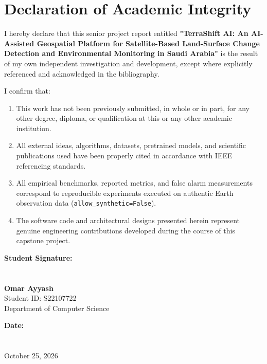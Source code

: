 \chapter*{Declaration of Academic Integrity}
\thispagestyle{empty}

I hereby declare that this senior project report entitled \textbf{"TerraShift AI: An AI-Assisted Geospatial Platform for Satellite-Based Land-Surface Change Detection and Environmental Monitoring in Saudi Arabia"} is the result of my own independent investigation and development, except where explicitly referenced and acknowledged in the bibliography.

I confirm that:
\begin{enumerate}
    \item This work has not been previously submitted, in whole or in part, for any other degree, diploma, or qualification at this or any other academic institution.
    \item All external ideas, algorithms, datasets, pretrained models, and scientific publications used have been properly cited in accordance with IEEE referencing standards.
    \item All empirical benchmarks, reported metrics, and false alarm measurements correspond to reproducible experiments executed on authentic Earth observation data (\texttt{allow\_synthetic=False}).
    \item The software code and architectural designs presented herein represent genuine engineering contributions developed during the course of this capstone project.
\end{enumerate}

\vspace*{2.5cm}

\noindent
\begin{minipage}{0.45\textwidth}
\textbf{Student Signature:}\\
\vspace*{1.0cm}\\
\hrulefill\\
\textbf{Omar Ayyash}\\
Student ID: S22107722\\
Department of Computer Science
\end{minipage}
\hfill
\begin{minipage}{0.45\textwidth}
\textbf{Date:}\\
\vspace*{1.0cm}\\
\hrulefill\\
October 25, 2026
\end{minipage}

\newpage
